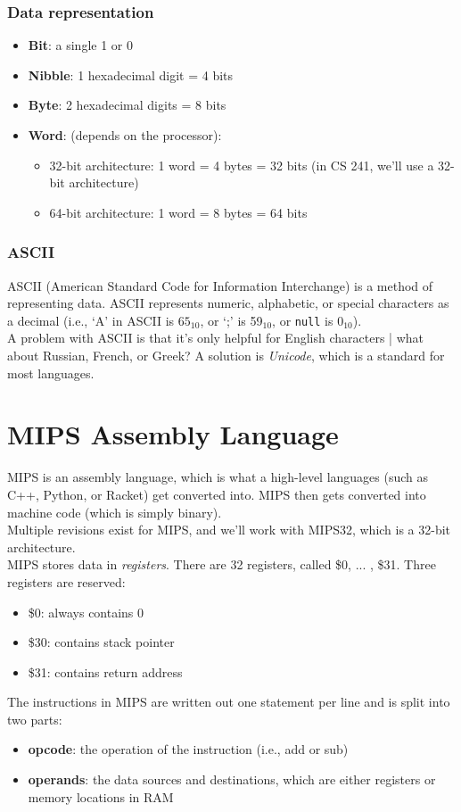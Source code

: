 \documentclass{report}
\begin{document}
\subsubsection{Data representation}
\begin{itemize}
\item \textbf{Bit}: a single 1 or 0
\item \textbf{Nibble}: 1 hexadecimal digit = 4 bits
\item \textbf{Byte}: 2 hexadecimal digits = 8 bits
\item \textbf{Word}: (depends on the processor):
\begin{itemize}
\item 32-bit architecture: 1 word = 4 bytes = 32 bits (in CS 241, we'll use a 32-bit architecture)
\item 64-bit architecture: 1 word = 8 bytes = 64 bits
\end{itemize}
\end{itemize}

\subsubsection{ASCII}
ASCII (American Standard Code for Information Interchange) is a method of representing data. ASCII represents numeric, alphabetic, or special characters as a decimal (i.e., `A' in ASCII is $65_{10}$, or `;' is 59$_{10}$, or \texttt{null} is $0_{10}$).\\
A problem with ASCII is that it's only helpful for English characters | what about Russian, French, or Greek? A solution is \textit{Unicode}, which is a standard for most languages.

\section{MIPS Assembly Language}
MIPS is an assembly language, which is what a high-level languages (such as C++, Python, or Racket) get converted into. MIPS then gets converted into machine code (which is simply binary).\\
Multiple revisions exist for MIPS, and we'll work with MIPS32, which is a 32-bit architecture.\\
MIPS stores data in \textit{registers}. There are 32 registers, called \$0, ... , \$31. Three registers are reserved:
\begin{itemize}
\item \$0: always contains 0
\item \$30: contains stack pointer
\item \$31: contains return address
\end{itemize}
The instructions in MIPS are written out one statement per line and is split into two parts:
\begin{itemize}
\item \textbf{opcode}: the operation of the instruction (i.e., add or sub)
\item \textbf{operands}: the data sources and destinations, which are either registers or memory locations in RAM
\end{itemize}
\end{document}
